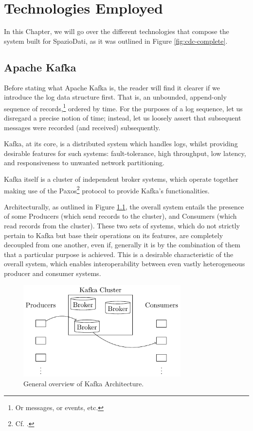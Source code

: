 \chapter{Technologies Employed}
\label{ch:techs}

In this Chapter, we will go over the different technologies that compose the system built for SpazioDati, as it was outlined in Figure \ref{fig:cdc-complete}.


\section{Apache Kafka}
\label{sec:kafka}

Before stating what Apache Kafka is, the reader will find it clearer if we introduce the log data structure first.
That is, an unbounded, append-only sequence of records,\footnote{%
	Or messages, or events, etc.
} ordered by time.
For the purposes of a log sequence, let us disregard a precise notion of time; instead, let us loosely assert that subsequent messages were recorded (and received) subsequently.

Kafka, at its core, is a distributed system which handles logs, whilst providing desirable features for such systems: fault-tolerance, high throughput, low latency, and responsiveness to unwanted network partitioning.

Kafka itself is a cluster of independent broker systems, which operate together making use of the Paxos\footnote{%
	Cf. \cite{paxos}.
} protocol to provide Kafka's functionalities.

Architecturally, as outlined in Figure \ref{fig:kafka-architecture}, the overall system entails the presence of some Producers (which send records to the cluster), and Consumers (which read records from the cluster).
These two sets of systems, which do not strictly pertain to Kafka but base their operations on its features, are completely decoupled from one another, even if, generally it is by the combination of them that a particular purpose is achieved.
This is a desirable characteristic of the overall system, which enables interoperability between even vastly heterogeneous producer and consumer systems.

\begin{figure}
	\centering
	\includegraphics[height=5cm]{figures/technologies/kafka-architecture}
	\caption{General overview of Kafka Architecture.}
	\label{fig:kafka-architecture}
\end{figure}

